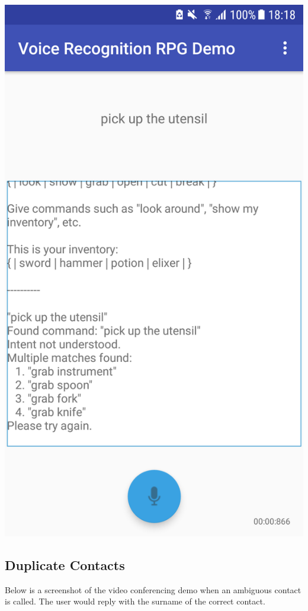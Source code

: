 \documentclass[11pt]{article}
\begin{document}
\begin{appendices}
\begin{center}
\includegraphics[scale=0.25]{utensil-3.png}
\end{center}

\newpage
\subsection{Duplicate Contacts}
\label{appendix:duplicate-contacts}
Below is a screenshot of the video conferencing demo when an ambiguous contact is called. The user would reply with the surname of the correct contact.


\end{appendices}
\end{document}

